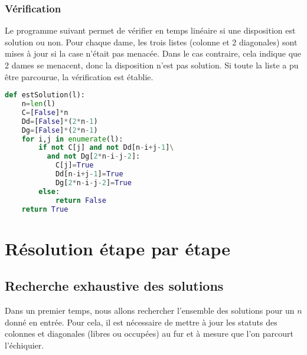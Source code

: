 \documentclass[a4paper]{article}
\begin{document}
\newpage
\subsubsection{Vérification}
Le programme suivant permet de vérifier en temps linéaire si une disposition est solution ou non. Pour chaque dame, les trois listes (colonne et 2 diagonales) sont mises à jour si la case n'était pas menacée. Dans le cas contraire, cela indique que 2 dames se menacent, donc la disposition n'est pas solution. Si toute la liste a pu être parcourue, la vérification est établie.
\begin{lstlisting}[language=Python,keywordstyle=\color{blue},stringstyle=\color{purple},commentstyle=\color{green},breaklines=true,]
def estSolution(l):
    n=len(l)
    C=[False]*n
    Dd=[False]*(2*n-1)
    Dg=[False]*(2*n-1)
    for i,j in enumerate(l):
        if not C[j] and not Dd[n-i+j-1]\
          and not Dg[2*n-i-j-2]:
            C[j]=True
            Dd[n-i+j-1]=True
            Dg[2*n-i-j-2]=True
        else:
            return False
    return True
\end{lstlisting}

\newpage
\section{Résolution étape par étape}

\subsection{Recherche exhaustive des solutions}
Dans un premier temps, nous allons rechercher l'ensemble des solutions pour un $n$ donné en entrée. Pour cela, il est nécessaire de mettre à jour les statuts des colonnes et diagonales (libres ou occupées) au fur et à mesure que l'on parcourt l'échiquier.
\end{document}
